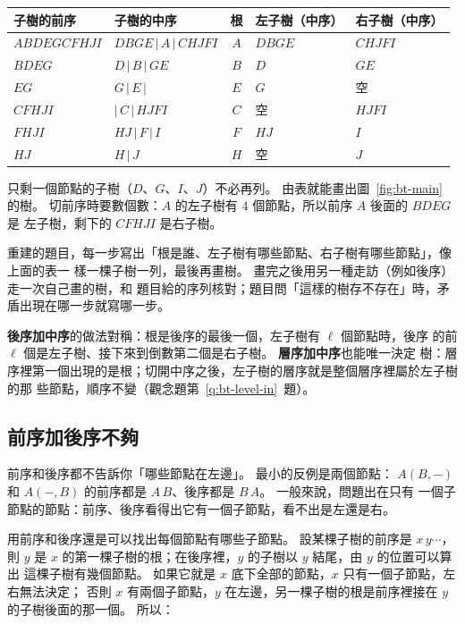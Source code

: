 \begin{center}
\begin{tabular}{llcll}
\toprule
子樹的前序 & 子樹的中序 & 根 & 左子樹（中序）& 右子樹（中序）\\
\midrule
$ABDEGCFHJI$ & $DBGE\,|\,A\,|\,CHJFI$ & $A$ & $DBGE$ & $CHJFI$ \\
$BDEG$ & $D\,|\,B\,|\,GE$ & $B$ & $D$ & $GE$ \\
$EG$ & $G\,|\,E\,|$ & $E$ & $G$ & 空 \\
$CFHJI$ & $|\,C\,|\,HJFI$ & $C$ & 空 & $HJFI$ \\
$FHJI$ & $HJ\,|\,F\,|\,I$ & $F$ & $HJ$ & $I$ \\
$HJ$ & $H\,|\,J$ & $H$ & 空 & $J$ \\
\bottomrule
\end{tabular}
\end{center}

只剩一個節點的子樹（$D$、$G$、$I$、$J$）不必再列。 由表就能畫出圖~\ref{fig:bt-main}
的樹。 切前序時要數個數：$A$ 的左子樹有 $4$ 個節點，所以前序 $A$ 後面的 $BDEG$ 是
左子樹，剩下的 $CFHJI$ 是右子樹。

\begin{examnote}
重建的題目，每一步寫出「根是誰、左子樹有哪些節點、右子樹有哪些節點」，像上面的表一
樣一棵子樹一列，最後再畫樹。 畫完之後用另一種走訪（例如後序）走一次自己畫的樹，和
題目給的序列核對；題目問「這樣的樹存不存在」時，矛盾出現在哪一步就寫哪一步。
\end{examnote}

\textbf{後序加中序}的做法對稱：根是後序的最後一個，左子樹有 $\ell$ 個節點時，後序
的前 $\ell$ 個是左子樹、接下來到倒數第二個是右子樹。 \textbf{層序加中序}也能唯一決定
樹：層序裡第一個出現的是根；切開中序之後，左子樹的層序就是整個層序裡屬於左子樹的那
些節點，順序不變（觀念題第~\ref{q:bt-level-in}~題）。

\subsection{前序加後序不夠}

前序和後序都不告訴你「哪些節點在左邊」。 最小的反例是兩個節點：
$A(B, -)$ 和 $A(-, B)$ 的前序都是 $A\,B$、後序都是 $B\,A$。 一般來說，問題出在只有
一個子節點的節點：前序、後序看得出它有一個子節點，看不出是左還是右。

用前序和後序還是可以找出每個節點有哪些子節點。 設某棵子樹的前序是 $x\,y \cdots$，則
$y$ 是 $x$ 的第一棵子樹的根；在後序裡，$y$ 的子樹以 $y$ 結尾，由 $y$ 的位置可以算出
這棵子樹有幾個節點。 如果它就是 $x$ 底下全部的節點，$x$ 只有一個子節點，左右無法決定；
否則 $x$ 有兩個子節點，$y$ 在左邊，另一棵子樹的根是前序裡接在 $y$ 的子樹後面的那一個。
所以：

